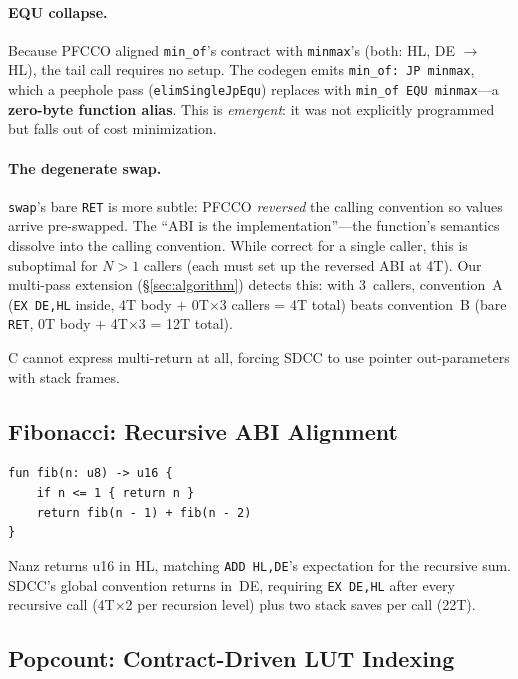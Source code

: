 \documentclass[sigplan,screen,nonacm]{acmart}
\begin{document}
\paragraph{EQU collapse.}
Because PFCCO aligned \texttt{min\_of}'s contract with \texttt{minmax}'s
(both: HL, DE $\to$ HL), the tail call requires no setup.  The codegen
emits \texttt{min\_of:~JP~minmax}, which a peephole pass
(\texttt{elimSingleJpEqu}) replaces with \texttt{min\_of~EQU~minmax}---a
\textbf{zero-byte function alias}.  This is \emph{emergent}: it was not
explicitly programmed but falls out of cost minimization.

\paragraph{The degenerate swap.}
\texttt{swap}'s bare \texttt{RET} is more subtle: PFCCO \emph{reversed} the
calling convention so values arrive pre-swapped.  The ``ABI is the
implementation''---the function's semantics dissolve into the calling
convention.  While correct for a single caller, this is suboptimal for
$N>1$ callers (each must set up the reversed ABI at 4T).  Our multi-pass
extension (\S\ref{sec:algorithm}) detects this: with 3~callers, convention~A
(\texttt{EX~DE,HL} inside, 4T body $+$ 0T$\times$3 callers = 4T total)
beats convention~B (bare \texttt{RET}, 0T body $+$ 4T$\times$3 = 12T total).

C cannot express multi-return at all, forcing SDCC to use pointer
out-parameters with stack frames.

\subsection{Fibonacci: Recursive ABI Alignment}

\begin{lstlisting}[language=nanz,caption={Recursive Fibonacci.}]
fun fib(n: u8) -> u16 {
    if n <= 1 { return n }
    return fib(n - 1) + fib(n - 2)
}
\end{lstlisting}

Nanz returns u16 in HL, matching \texttt{ADD~HL,DE}'s expectation for the
recursive sum.  SDCC's global convention returns in~DE, requiring
\texttt{EX~DE,HL} after every recursive call (4T$\times$2 per recursion
level) plus two stack saves per call (22T).

\subsection{Popcount: Contract-Driven LUT Indexing}
\end{document}
